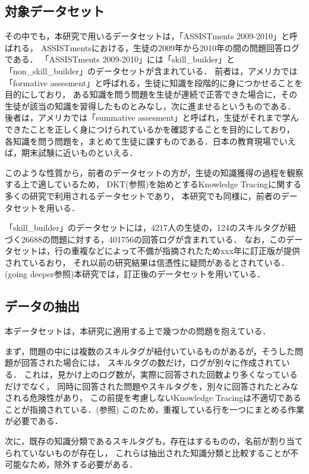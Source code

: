 \subsection{対象データセット}
その中でも，本研究で用いるデータセットは，「ASSISTments 2009-2010」と呼ばれる，
ASSISTmentsにおける，生徒の2009年から2010年の間の問題回答ログである．
「ASSISTments 2009-2010」には「skill\_builder」と「non\_skill\_builder」のデータセットが含まれている．
前者は，アメリカでは「formative assesment」と呼ばれる，生徒に知識を段階的に身につかせることを目的にしており，
ある知識を問う問題を生徒が連続で正答できた場合に，その生徒が該当の知識を習得したものとみなし，次に進ませるというものである．
後者は，アメリカでは「summative assesment」と呼ばれ，生徒がそれまで学んできたことを正しく身につけられているかを確認することを目的にしており，
各知識を問う問題を，まとめて生徒に課すものである．日本の教育現場でいえば，期末試験に近いものといえる．

このような性質から，前者のデータセットの方が，生徒の知識獲得の過程を観察する上で適しているため，
DKT(参照)を始めとするKnowledge Tracingに関する多くの研究で利用されるデータセットであり，
本研究でも同様に，前者のデータセットを用いる．

「skill\_builder」のデータセットには，4217人の生徒の，124のスキルタグが紐づく26688の問題に対する，401756の回答ログが含まれている．
なお，このデータセットは，行の重複などによって不備が指摘されたためxxx年に訂正版が提供されているおり，
それ以前の研究結果は信憑性に疑問があるとされている．(going deeper参照)本研究では，訂正後のデータセットを用いている．


\subsection{データの抽出}
本データセットは，本研究に適用する上で幾つかの問題を抱えている．

まず，問題の中には複数のスキルタグが紐付いているものがあるが，そうした問題が回答された場合には，
スキルタグの数だけ，ログが別々に作成されている．
これは，見かけ上のログ数が，実際に回答された回数より多くなっているだけでなく，
同時に回答された問題やスキルタグを，別々に回答されたとみなされる危険性があり，
この前提を考慮しないKnowledge Tracingは不適切であることが指摘されている．(参照)
このため，重複している行を一つにまとめる作業が必要である．

次に，既存の知識分類であるスキルタグも，存在はするものの，名前が割り当てられていないものが存在し，
これらは抽出された知識分類と比較することが不可能なため，除外する必要がある．


